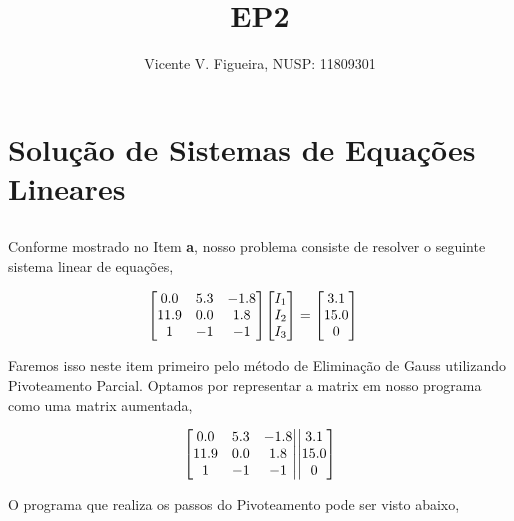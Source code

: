 \documentclass[twoside]{amsart}
\title
{
    \Huge EP2
}
\author
{
    \large Vicente V. Figueira, NUSP: 11809301
}
\numberwithin{equation}{section}
\begin{document}
\maketitle





\section{\Large Solução de Sistemas de Equações Lineares}

\setcounter{subsection}{1}

\subsection{}

Conforme mostrado no Item \textbf{a}, nosso problema consiste de resolver o seguinte sistema linear de equações,

\begin{align}
    \mqty[0.0 & 5.3 & -1.8\\ 11.9 & 0.0 & 1.8 \\ 1 & -1 & -1]\mqty[I_1\\ I_2\\ I_3]&=\mqty[3.1\\15.0\\0]
\end{align}

Faremos isso neste item primeiro pelo método de Eliminação de Gauss utilizando Pivoteamento Parcial. Optamos por 
representar a matrix em nosso programa como uma matrix aumentada,

\begin{align}
    \mqty[\mqty{0.0 & 5.3 & -1.8\\ 11.9 & 0.0 & 1.8 \\ 1 & -1 & -1}\mqty|\\ \\ \\|\mqty{3.1\\15.0\\0}]
\end{align}

O programa que realiza os passos do Pivoteamento pode ser visto abaixo,
\end{document}
